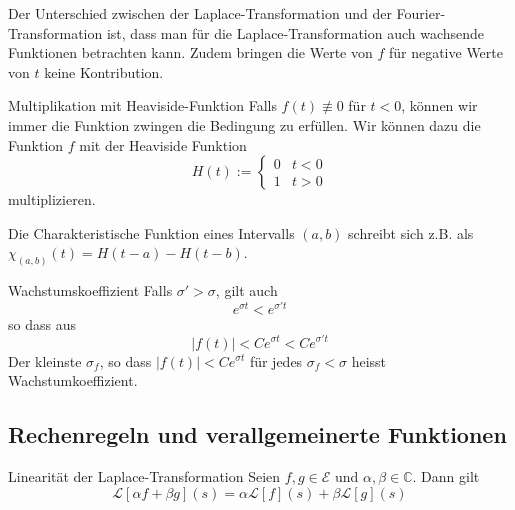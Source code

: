 \documentclass[a4paper,10pt]{article}
\begin{document}
Der Unterschied zwischen der Laplace-Transformation und der Fourier-Transformation ist, dass man für die Laplace-Transformation auch wachsende Funktionen betrachten kann. Zudem bringen die Werte von $f$ für negative Werte von $t$ keine Kontribution.

\begin{subbox}{Multiplikation mit Heaviside-Funktion}
  Falls \(f(t)\not\equiv0\) für \(t<0\), können wir immer die Funktion zwingen die Bedingung zu erfüllen. Wir können dazu die Funktion \(f\) mit der Heaviside Funktion \begin{equation*} H(t):=\begin{cases} 0 & t < 0 \\ 1 & t > 0 \end{cases} \end{equation*} multiplizieren.
\end{subbox}

Die Charakteristische Funktion eines Intervalls $(a,b)$ schreibt sich z.B. als \(\chi_{(a,b)}(t)=H(t-a)-H(t-b)\).


\begin{subbox}{Wachstumskoeffizient}
  Falls \(\sigma'>\sigma\), gilt auch \begin{equation*} e^{\sigma t} < e^{\sigma' t} \end{equation*} so dass aus \begin{equation*} |f(t)| < C e^{\sigma t} < Ce^{\sigma' t} \end{equation*} Der kleinste \(\sigma_f \), so dass \(|f(t)| < Ce^{\sigma t}\) für jedes \(\sigma_f < \sigma\) heisst Wachstumkoeffizient.

\end{subbox}

\subsection{Rechenregeln und verallgemeinerte Funktionen}

\begin{subbox}{Linearität der Laplace-Transformation}
  Seien \(f,g\in\mathcal{E}\) und \(\alpha,\beta\in\mathbb{C}\). Dann gilt \begin{equation*} \mathcal{L}[\alpha f+\beta g](s)=\alpha\mathcal{L}[f](s)+\beta\mathcal{L}[g](s) \end{equation*}
\end{subbox}
\end{document}
